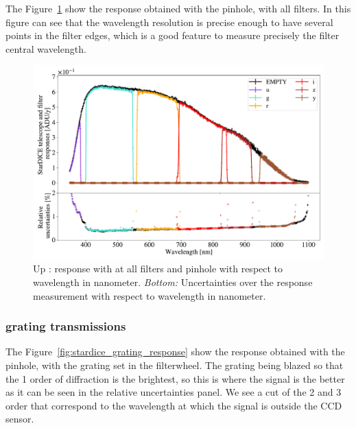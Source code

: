The Figure~\ref{fig:stardice_75um_response} show the \SD response obtained with the \spinhole pinhole, with all filters. In this figure can see that the wavelength resolution is precise enough to have several points in the filter edges, which is a good feature to measure precisely the filter central wavelength. 

\begin{figure}[h]
    \centering
    \includegraphics[width=\columnwidth]{fig/stardice_75um_response.pdf}
    \caption{Up : \SD response with at all filters and \spinhole pinhole with respect to wavelength in nanometer. \textit{Bottom:} Uncertainties over the \SD response measurement with respect to wavelength in nanometer.}
    \label{fig:stardice_75um_response}
\end{figure}

\subsubsection{\SD grating transmissions}

The Figure~\ref{fig:stardice_grating_response} show the \SD response obtained with the \spinhole pinhole, with the grating set in the filterwheel. The grating being blazed so that the 1 order of diffraction is the brightest, so this is where the signal is the better as it can be seen in the relative uncertainties panel. We see a cut of the 2 and 3 order that correspond to the wavelength at which the signal is outside the CCD sensor.

